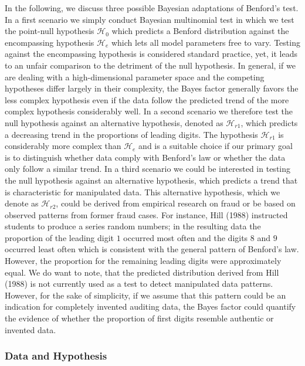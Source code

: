 \documentclass[
  english,
  man,floatsintext]{apa6}
\begin{document}
In the following, we discuss three possible Bayesian adaptations of Benford's test. In a first scenario we simply conduct Bayesian multinomial test in which we test the point-null hypothesis \(\mathcal{H}_0\) which predicts a Benford distribution against the encompassing hypothesis \(\mathcal{H}_{e}\) which lets all model parameters free to vary. Testing against the encompassing hypothesis is considered standard practice, yet, it leads to an unfair comparison to the detriment of the null hypothesis. In general, if we are dealing with a high-dimensional parameter space and the competing hypotheses differ largely in their complexity, the Bayes factor generally favors the less complex hypothesis even if the data follow the predicted trend of the more complex hypothesis considerably well. In a second scenario we therefore test the null hypothesis against an alternative hypothesis, denoted as \(\mathcal{H}_{r1}\), which predicts a decreasing trend in the proportions of leading digits. The hypothesis \(\mathcal{H}_{r1}\) is considerably more complex than \(\mathcal{H}_{e}\) and is a suitable choice if our primary goal is to distinguish whether data comply with Benford's law or whether the data only follow a similar trend. In a third scenario we could be interested in testing the null hypothesis against an alternative hypothesis, which predicts a trend that is characteristic for manipulated data. This alternative hypothesis, which we denote as \(\mathcal{H}_{r2}\), could be derived from empirical research on fraud or be based on observed patterns from former fraud cases. For instance, Hill (1988) instructed students to produce a series random numbers; in the resulting data the proportion of the leading digit \(1\) occurred most often and the digits \(8\) and \(9\) occurred least often which is consistent with the general pattern of Benford's law. However, the proportion for the remaining leading digits were approximately equal. We do want to note, that the predicted distribution derived from Hill (1988) is not currently used as a test to detect manipulated data patterns. However, for the sake of simplicity, if we assume that this pattern could be an indication for completely invented auditing data, the Bayes factor could quantify the evidence of whether the proportion of first digits resemble authentic or invented data.

\hypertarget{data-and-hypothesis}{%
\subsubsection{Data and Hypothesis}\label{data-and-hypothesis}}
\end{document}
